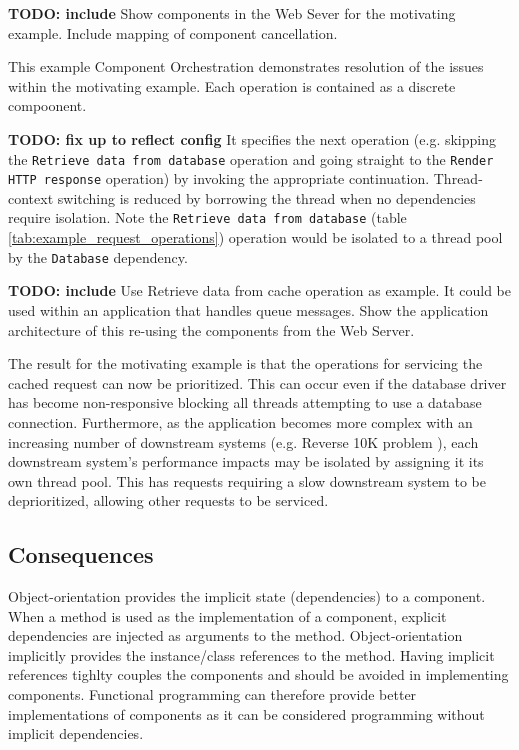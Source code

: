 \documentclass[prodmode]{style/acmlarge}
\begin{document}
\textbf{TODO: include} Show components in the Web Sever for the motivating
example.  Include mapping of component cancellation.

This example Component Orchestration demonstrates resolution of the issues
within the motivating example.  Each operation is contained as a discrete
compoonent.  

\textbf{TODO: fix up to reflect config} It specifies the next operation (e.g.
skipping the \texttt{Retrieve data from database} operation and going straight
to the \texttt{Render HTTP response} operation) by invoking the appropriate
continuation.  Thread-context switching is reduced by borrowing the thread when
no dependencies require isolation.  Note the \texttt{Retrieve data from
database} (table \ref{tab:example_request_operations}) operation would be
isolated to a thread pool by the \texttt{Database} dependency.

\textbf{TODO: include} Use Retrieve data from cache operation as example.  It
could be used within an application that handles queue messages.  Show the
application architecture of this re-using the components from the Web Server.

The result for the motivating example is that the operations for servicing the
cached request can now be prioritized.  This can occur even if the database
driver has become non-responsive blocking all threads attempting to use a
database connection.  Furthermore, as the application becomes more complex with
an increasing number of downstream systems (e.g. Reverse 10K problem
\cite{reverse-ten-k-problem}), each downstream system's performance impacts may
be isolated by assigning it its own thread pool.  This has requests requiring a
slow downstream system to be deprioritized, allowing other requests to be
serviced.

\subsection{Consequences}

Object-orientation provides the implicit state (dependencies) to a component.
When a method is used as the implementation of a component, explicit
dependencies are injected as arguments to the method.  Object-orientation
implicitly provides the instance/class references to the method.  Having
implicit references tighlty couples the components and should be avoided in
implementing components.  Functional programming can therefore provide better
implementations of components as it can be considered programming without
implicit dependencies.
\end{document}
